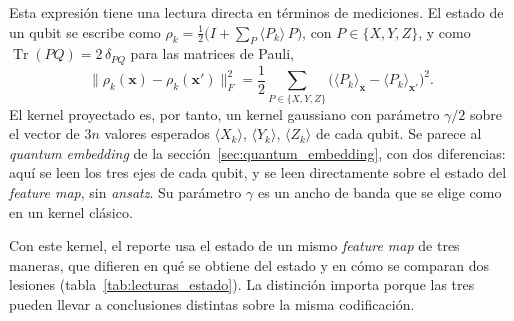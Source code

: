 Esta expresión tiene una lectura directa en términos de mediciones. El estado de un qubit se escribe como $\rho_k = \tfrac{1}{2}\bigl(I + \sum_{P} \langle P_k \rangle\, P\bigr)$, con $P \in \{X, Y, Z\}$, y como $\operatorname{Tr}(PQ) = 2\,\delta_{PQ}$ para las matrices de Pauli,
\begin{equation}
  \bigl\lVert \rho_k(\mathbf{x}) - \rho_k(\mathbf{x}') \bigr\rVert_F^2 = \frac{1}{2} \sum_{P \in \{X,Y,Z\}} \bigl(\langle P_k \rangle_{\mathbf{x}} - \langle P_k \rangle_{\mathbf{x}'}\bigr)^2 .
  \label{eq:kpq_pauli}
\end{equation}
El kernel proyectado es, por tanto, un kernel gaussiano con parámetro $\gamma/2$ sobre el vector de $3n$ valores esperados $\langle X_k \rangle$, $\langle Y_k \rangle$, $\langle Z_k \rangle$ de cada qubit. Se parece al \textit{quantum embedding} de la sección~\ref{sec:quantum_embedding}, con dos diferencias: aquí se leen los tres ejes de cada qubit, y se leen directamente sobre el estado del \textit{feature map}, sin \textit{ansatz}. Su parámetro $\gamma$ es un ancho de banda que se elige como en un kernel clásico.

Con este kernel, el reporte usa el estado de un mismo \textit{feature map} de tres maneras, que
difieren en qué se obtiene del estado y en cómo se comparan dos lesiones (tabla~\ref{tab:lecturas_estado}).
La distinción importa porque las tres pueden llevar a conclusiones distintas sobre la misma codificación.

